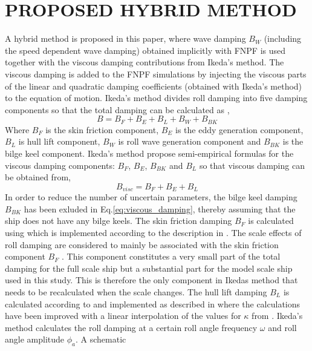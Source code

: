 \section*{PROPOSED HYBRID METHOD}\label{proposed-hybrid-method}
A hybrid method is proposed in this paper, where wave damping $B_W$
(including the speed dependent wave damping) obtained implicitly with
FNPF is used together with the viscous damping contributions from
Ikeda's method. The viscous damping is added to the FNPF simulations by
injecting the viscous parts of the linear and quadratic damping
coefficients (obtained with Ikeda's method) to the equation of motion.
Ikeda's method divides roll damping into five damping components so that
the total damping can be calculated as \citep{7505983/937PN5DT},
\begin{equation}
B = B_F + B_E + B_L + B_W + B_{BK}
\end{equation}
Where $B_F$ is the skin friction component, $B_E$ is the eddy
generation component, $B_L$ is hull lift component, $B_W$ is roll
wave generation component and $B_{BK}$ is the bilge keel component.
Ikeda's method propose semi-empirical formulas for the viscous damping
components: $B_F$, $B_E$, $B_{BK}$ and $B_L$ so that viscous
damping can be obtained from,
\begin{equation}
\label{eq:viscous_damping}
B_{visc} = B_F + B_E + B_L
\end{equation}
\quad In order to reduce the number of uncertain parameters, the bilge
keel damping $B_{BK}$ has been exluded in
Eq.\ref{eq:viscous_damping}, thereby assuming that the ship does
not have any bilge keels.
\quad The skin friction damping $B_F$ is calculated using
\citep{7505983/CKCMI3N9} which is implemented according to the
description in \citep{7505983/UGK6YEVD}. The scale effects of roll
damping are considered to mainly be associated with the skin friction
component $B_F$ \citep{7505983/FB64RGPF}. This component constitutes a
very small part of the total damping for the full scale ship but a
substantial part for the model scale ship used in this study. This is
therefore the only component in Ikedas method that needs to be
recalculated when the scale changes.
\quad The hull lift damping $B_L$ is calculated according to
\citep{7505983/937PN5DT} and implemented as described in
\citep{7505983/UYUAYY7E} where the calculations have been improved with a
linear interpolation of the values for $\kappa$ from
\citep{7505983/937PN5DT}.
\quad Ikeda's method calculates the roll damping at a certain roll angle
frequency $\omega$ and roll angle amplitude $\phi_a$. A schematic
